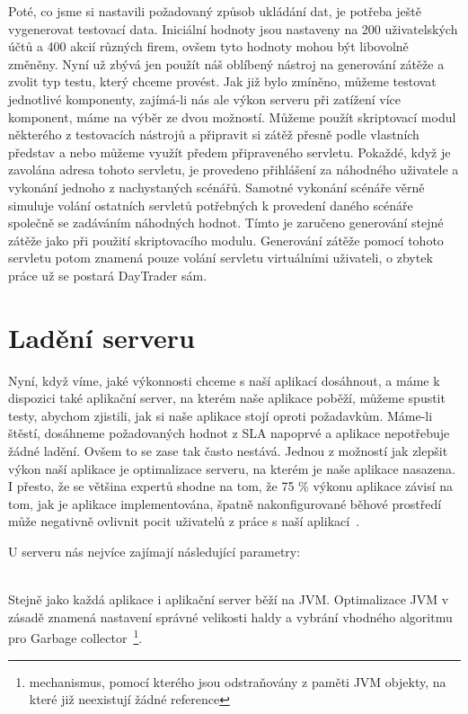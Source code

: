 \documentclass[122pt,oneside]{fithesis}
\begin{document}
Poté, co jsme si nastavili požadovaný způsob ukládání dat, je potřeba ještě vygenerovat testovací data. Iniciální hodnoty jsou nastaveny na 200 uživatelských účtů a 400 akcií různých firem, ovšem tyto hodnoty mohou být libovolně změněny. Nyní už zbývá jen použít náš oblíbený nástroj na generování zátěže a zvolit typ testu, který chceme provést. Jak již bylo zmíněno, můžeme testovat jednotlivé komponenty, zajímá-li nás ale výkon serveru při zatížení více komponent, máme na výběr ze dvou možností. Můžeme použít skriptovací modul některého z testovacích nástrojů a připravit si zátěž přesně podle vlastních představ a nebo můžeme využít předem připraveného servletu. Pokaždé, když je zavolána adresa tohoto servletu, je provedeno přihlášení za náhodného uživatele a vykonání jednoho z nachystaných scénářů. Samotné vykonání scénáře věrně simuluje volání ostatních servletů potřebných k provedení daného scénáře společně se zadáváním náhodných hodnot. Tímto je zaručeno generování stejné zátěže jako při použití skriptovacího modulu. Generování zátěže pomocí tohoto servletu potom znamená pouze volání servletu virtuálními uživateli, o zbytek práce už se postará DayTrader sám.

\section{Ladění serveru}
Nyní, když víme, jaké výkonnosti chceme s naší aplikací dosáhnout, a máme k dispozici také aplikační server, na kterém naše aplikace poběží, můžeme spustit testy, abychom zjistili, jak si naše aplikace stojí oproti požadavkům. Máme-li štěstí, dosáhneme požadovaných hodnot z SLA napoprvé a aplikace nepotřebuje žádné ladění. Ovšem to se zase tak často nestává. Jednou z možností jak zlepšit výkon naší aplikace je optimalizace serveru, na kterém je naše aplikace nasazena. I přesto, že se většina expertů shodne na tom, že 75 \% výkonu aplikace závisí na tom, jak je aplikace implementována, špatně nakonfigurované běhové prostředí může negativně ovlivnit pocit uživatelů z práce s naší aplikací~\cite{performanceTuning}. 

U serveru nás nejvíce zajímají následující parametry:

\vspace{5 mm}
\\\indent Stejně jako každá aplikace i aplikační server běží na JVM. Optimalizace JVM v zásadě znamená nastavení správné velikosti haldy a vybrání vhodného algoritmu pro Garbage collector~\footnote{mechanismus, pomocí kterého jsou odstraňovány z paměti JVM objekty, na které již neexistují žádné reference}.
\end{document}
